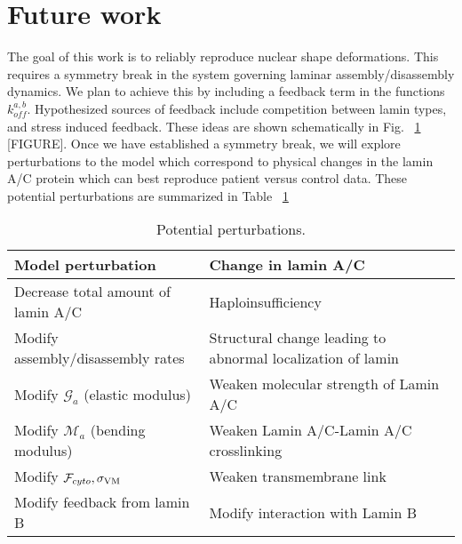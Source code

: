 \section{Future work}

The goal of this work is to reliably reproduce nuclear shape deformations. This requires a symmetry break in the system governing laminar assembly/disassembly dynamics. We plan to achieve this by including a feedback term in the functions $k_{off}^{a,b}$. Hypothesized sources of feedback include competition between lamin types, and stress induced feedback. These ideas are shown schematically in Fig. ~\ref{} [FIGURE]. Once we have established a symmetry break, we will explore perturbations to the model which correspond to physical changes  in the lamin A/C protein which can best reproduce patient versus control data. These potential perturbations are summarized in Table ~\ref{tab:perturbations}

\begin{table}[t!]
\caption{Potential perturbations.}\centering \label{tab:perturbations} 
\begin{tabular}{ l  l}
\hline
Model perturbation & Change in lamin A/C \\
\hline
Decrease total amount of lamin A/C  & Haploinsufficiency  \\
Modify assembly/disassembly rates & Structural change leading to abnormal localization of lamin\\
Modify $\mathcal{G}_a$ (elastic modulus) & Weaken molecular strength of Lamin A/C  \\
Modify $\mathcal{M}_a$ (bending modulus)& Weaken Lamin A/C-Lamin A/C crosslinking  \\
Modify $\mathcal{F}_{cyto}, \sigma_{\rm VM}$ & Weaken transmembrane link  \\
Modify feedback from lamin B &Modify interaction with Lamin B \\
\hline
\end{tabular}
\end{table}